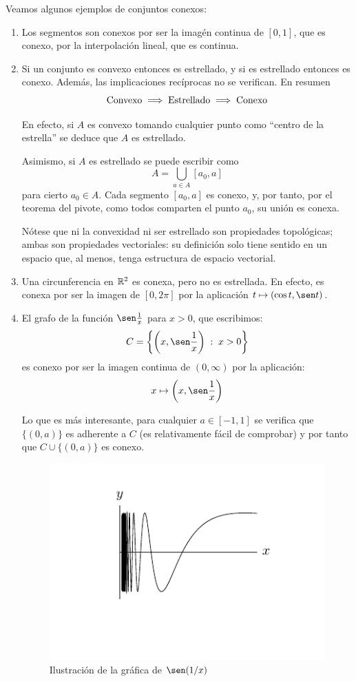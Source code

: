 \begin{exa}[Miscelánea]
	\label{conex_exa_miscel}
	Veamos algunos ejemplos de conjuntos conexos:
	\begin{enumerate}
		\item Los segmentos son conexos por ser la imagén continua de $[0,1]$, que es conexo, por la interpolación lineal, que es continua.
		\item Si un conjunto es convexo entonces es estrellado, y si es estrellado entonces es conexo. Además, las implicaciones recíprocas no se verifican. En resumen
		\[\text{Convexo}\implies\text{Estrellado}\implies \text{Conexo}\]
		
		En efecto, si $A$ es convexo tomando cualquier punto como ``centro de la estrella'' se deduce que $A$ es estrellado.
		
		Asimismo, si $A$ es estrellado se puede escribir como
		\[A=\bigcup_{a\in A} [a_0, a]\]
		para cierto $a_0\in A$. Cada segmento $[a_0,a]$ es conexo, y, por tanto, por el teorema del pivote, como todos comparten el punto $a_0$, su unión es conexa.
		
		Nótese que ni la convexidad ni ser estrellado son propiedades topológicas; ambas son propiedades vectoriales: su definición solo tiene sentido en un espacio que, al menos, tenga estructura de espacio vectorial.
		
		\item Una circunferencia en $\mathbb{R}^2$ es conexa, pero no es estrellada. En efecto, es conexa por ser la imagen de $[0,2\pi]$ por la aplicación $t\mapsto (\cos t, \sen t)$.
		
		\item El grafo de la función $\sen\frac{1}{x}$ para $x>0$, que escribimos:
		\[C = \left\{\left(x,\sen\frac{1}{x}\right)\midc x>0\right\}\]
		es conexo por ser la imagen continua de $(0,\infty)$ por la aplicación:
		\[x\mapsto \left(x,\sen\frac{1}{x}\right)\]
		
		Lo que es más interesante, para cualquier $a\in [-1,1]$ se verifica que $\{(0,a)\}$ es adherente a $C$ (es relativamente fácil de comprobar) y por tanto que $C\cup\{(0,a)\}$ es conexo.
		\begin{figure}[H]
			\centering
			\includegraphics[scale = 0.8]{img/funcionsen1x}
			\caption{Ilustración de la gráfica de $\sen(1/x)$}
		\end{figure}
		

\end{enumerate}
\end{exa}
